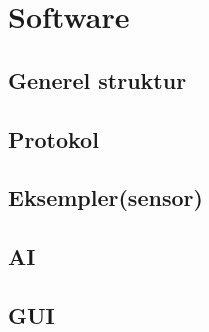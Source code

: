 \section{Software}

\subsection{Generel struktur}

\subsection{Protokol}

\subsection{Eksempler(sensor)}

\subsection{AI}

\subsection{GUI}

